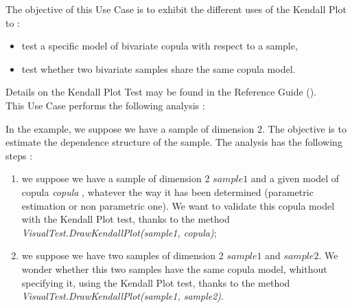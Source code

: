 \renewcommand{\filename}{docUC_InputWithData_CopulaKendallPlotTest.tex}
\renewcommand{\filetitle}{UC : Copula validation through the Kendall Plot Test}

\HeaderIIILevel


\label{copula_validation}





The objective of this Use Case is to exhibit the different uses of the Kendall Plot to :
\begin{itemize}
\item test a specific model of bivariate copula with respect to a sample,
\item test whether two bivariate samples share the same copula model.
\end{itemize}


Details on the Kendall Plot Test may be found in the Reference Guide ().\\


This Use Case performs the following analysis :

In the example, we suppose we have a sample of dimension 2. The objective is to estimate the dependence structure of the sample. The analysis  has the following steps :
\begin{enumerate}
\item  we suppose we have a sample of dimension 2 $sample1$ and a given model of copula \textit{copula} , whatever the way it has been determined (parametric estimation or non parametric one). We want to validate this copula model with the Kendall Plot test, thanks to the method \emph{VisualTest.DrawKendallPlot(sample1, copula)};
\item we suppose we have two samples of dimension 2 $sample1$ and $sample2$. We wonder whether this two samples have the same copula model, whithout specifying it, using the Kendall Plot test, thanks to the method \emph{VisualTest.DrawKendallPlot(sample1, sample2)}.
\end{enumerate}

